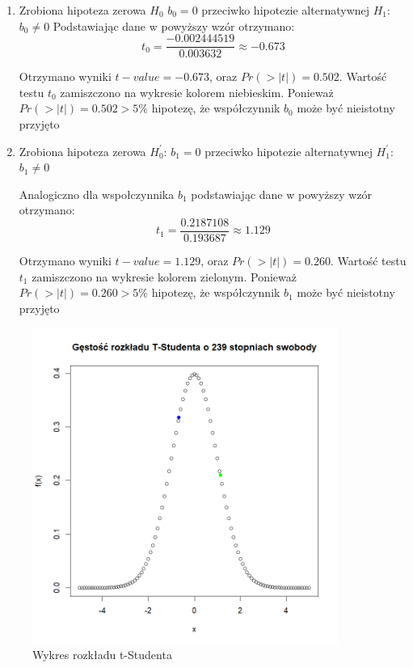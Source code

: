 \documentclass[a4paper,11pt]{article}
\begin{document}
\begin{enumerate}
  \item Zrobiona hipoteza zerowa $H_{0}$\: $b_{0}=0$ przeciwko hipotezie alternatywnej $H_{1}$: $b_{0} \ne 0$
  Podstawiając dane w powyższy wzór otrzymano: \[ t_0 = \frac{-0.002444519}{0.003632} \approx -0.673\]  

  Otrzymano wyniki $t-value = -0.673$, oraz $Pr(>|t|) = 0.502$. Wartość testu $t_0$ zamiszczono na wykresie kolorem niebieskim. Ponieważ $Pr(>|t|) = 0.502 > 5\%$ hipotezę, że współczynnik $b_{0}$ może być nieistotny przyjęto

  
  
  \item  Zrobiona hipoteza zerowa $H_{0}^{\prime}$: $b_{1}=0$ przeciwko hipotezie alternatywnej $H_{1}^{\prime}$: $b_{1} \ne 0$

  Analogiczno dla wspołczynnika $b_{1}$ podstawiając dane w powyższy wzór otrzymano: \[ t_1 = \frac{0.2187108}{0.193687} \approx 1.129\]  

  Otrzymano wyniki $t-value = 1.129$, oraz $Pr(>|t|) = 0.260$. Wartość testu $t_1$ zamiszczono na wykresie kolorem zielonym. Ponieważ $Pr(>|t|) = 0.260 > 5\%$ hipotezę, że współczynnik $b_{1}$ może być nieistotny przyjęto

\end{enumerate}


\begin{figure}[!htb]
	\centering
	\includegraphics[width=10cm]{tStudent.png}
	\caption{Wykres rozkładu t-Studenta}
         \label{fig:tStudent}
\end{figure}
\end{document}
